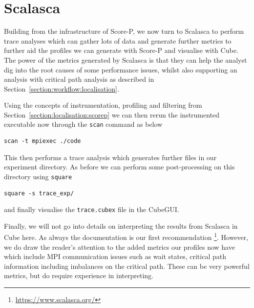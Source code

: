 \section{Scalasca} 
\label{section:localisation:scalasca}

Building from the infrastructure of Score-P, we now turn to Scalasca to perform
trace analyses which can gather lots of data and generate further metrics to
further aid the profiles we can generate with Score-P and visualise with Cube.
The power of the metrics generated by Scalasca is that they can help the
analyst dig into the root causes of some performance issues, whilst also
supporting an analysis with critical path analysis as described in
Section~\ref{section:workflow:localisation}.

Using the concepts of instrumentation, profiling and filtering from
Section~\ref{section:localisation:scorep} we can then rerun the instrumented
executable now through the \texttt{scan} command as below
\begin{verbatim}
scan -t mpiexec ./code
\end{verbatim}
This then performs a trace analysis which generates further files in our
experiment directory. As before we can perform some post-processing on this
directory using \texttt{square}
\begin{verbatim}
square -s trace_exp/
\end{verbatim}
and finally visualise the \texttt{trace.cubex} file in the CubeGUI.

Finally, we will not go into details on interpreting the results from Scalasca
in Cube here. As always the documentation is our first recommendation
\footnote{\url{https://www.scalasca.org/}}. However, we do draw the reader's
attention to the added metrics our profiles now have which include MPI
communication issues such as wait states, critical path information including
imbalances on the critical path. These can be very powerful metrics, but do
require experience in interpreting.
